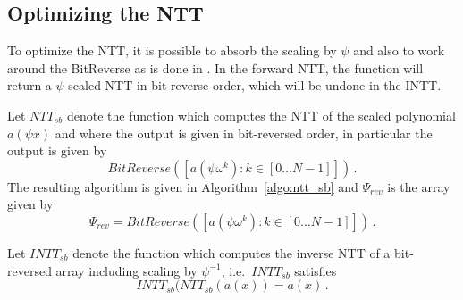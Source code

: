 \subsection{Optimizing the NTT}

To optimize the NTT, it is possible to absorb the scaling by $\psi$ and also to work around 
the BitReverse as is done in \cite{longa}.  In the forward NTT, the function will return a $\psi$-scaled NTT
in bit-reverse order, which will be undone in the INTT.

Let $NTT_{sb}$ denote the function which computes the NTT of the scaled polynomial $a(\psi x)$ and where the output 
is given in bit-reversed order, in particular the output is given by 
\[  BitReverse(  [a(\psi \omega^{k}) : k \in [0 \ldots N-1]]   ) \, .  \]
The resulting algorithm is given in Algorithm~\ref{algo:ntt_sb} and $\Psi_{rev}$ is the 
array given by 
\[ \Psi_{rev} = BitReverse( [ a(\psi \omega^{k}) : k \in [0 \ldots N-1]] ) \, . \]

\begin{algorithm}[!t] \label{algo:ntt_sb}
\begin{scriptsize}
\caption{\emph{$NTT_{sb}$}}
\end{scriptsize}
\end{algorithm} 

Let $INTT_{sb}$ denote the function which computes the inverse NTT of a bit-reversed array 
including scaling by $\psi^{-1}$, i.e.\ $INTT_{sb}$ satisfies
\[ INTT_{sb} (NTT_{sb}(a(x)) = a(x) \, . \]

